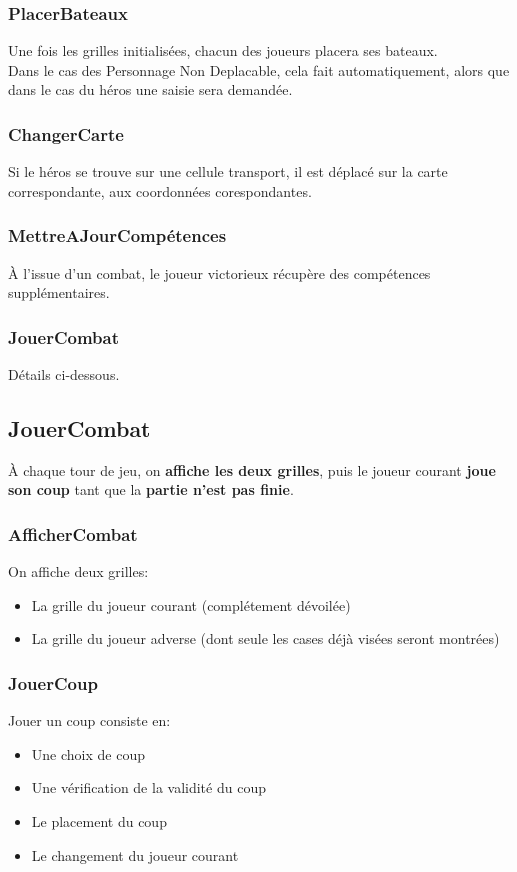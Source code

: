             \subsubsection{PlacerBateaux}
                Une fois les grilles initialisées, chacun des joueurs placera ses bateaux.\\
                Dans le cas des Personnage Non Deplacable, cela fait automatiquement, alors que dans le cas du héros une saisie sera demandée.
                \subsubsection{ChangerCarte}
                    Si le héros se trouve sur une cellule transport, il est d\'eplacé sur la carte correspondante, aux coordonnées corespondantes.
                \subsubsection{MettreAJourComp\'etences}
                    À l'issue d'un combat, le joueur victorieux r\'ecupère des comp\'etences suppl\'ementaires.
                \subsubsection{JouerCombat}
                    Détails ci-dessous.
        \subsection{JouerCombat}
            À chaque tour de jeu, on \textbf{affiche les deux grilles}, puis le joueur courant \textbf{joue son coup} tant que la \textbf{partie n'est pas finie}.
            \subsubsection{AfficherCombat}
                On affiche deux grilles:
                \begin{itemize}
                    \item La grille du joueur courant (compl\'etement dévoilée)
                    \item La grille du joueur adverse (dont seule les cases déjà visées seront montrées)
                \end{itemize}
            \subsubsection{JouerCoup}
                Jouer un coup consiste en:
                \begin{itemize}
                    \item Une choix de coup
                    \item Une vérification de la validité du coup
                    \item Le placement du coup
                    \item Le changement du joueur courant
                \end{itemize}
